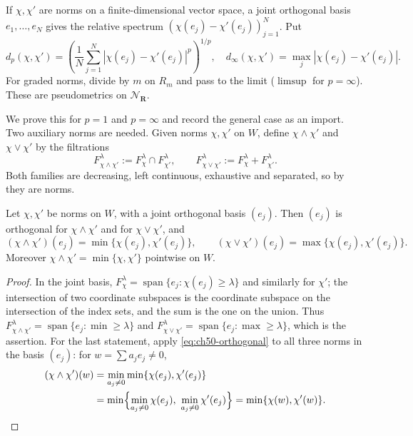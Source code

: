 If $\chi,\chi'$ are norms on a finite-dimensional vector space, a joint
orthogonal basis $e_1,\dots,e_N$ gives the relative spectrum
$(\chi(e_j)-\chi'(e_j))_{j=1}^N$.  Put
\[
 d_p(\chi,\chi')
 =\left(\frac1N\sum_{j=1}^N
       |\chi(e_j)-\chi'(e_j)|^p\right)^{1/p},
\quad
 d_\infty(\chi,\chi')=\max_j|\chi(e_j)-\chi'(e_j)|.
\tag{50.7}\label{eq:stability-finite-dimensional-dp}
\]
For graded norms, divide by $m$ on $R_m$ and pass to the limit
($\limsup$ for $p=\infty$).  These are pseudometrics on
$\mathcal N_{\mathbf R}$.

We prove this for $p=1$ and $p=\infty$ and record the general case as
an import.  Two auxiliary norms are needed.  Given norms $\chi,\chi'$ on
$W$, define $\chi\wedge\chi'$ and $\chi\vee\chi'$ by the filtrations
\[
 F^\lambda_{\chi\wedge\chi'}:=F^\lambda_\chi\cap F^\lambda_{\chi'},
 \qquad
 F^\lambda_{\chi\vee\chi'}:=F^\lambda_\chi+F^\lambda_{\chi'}.
\tag{50.8}\label{eq:ch50-lattice-norms}
\]
Both families are decreasing, left continuous, exhaustive and separated, so
by  they are norms.

\par\noindent\begin{minipage}{\textwidth}
\begin{lemma}
\label{lem:ch50-lattice}
Let $\chi,\chi'$ be norms on $W$, with a joint orthogonal basis
$(e_j)$.  Then $(e_j)$ is orthogonal for $\chi\wedge\chi'$ and for
$\chi\vee\chi'$, and
\[
 (\chi\wedge\chi')(e_j)=\min\{\chi(e_j),\chi'(e_j)\},
 \qquad
 (\chi\vee\chi')(e_j)=\max\{\chi(e_j),\chi'(e_j)\}.
\]
Moreover $\chi\wedge\chi'=\min\{\chi,\chi'\}$ pointwise on $W$.
\end{lemma}
\end{minipage}\par\medskip

\begin{proof}
In the joint basis, $F^\lambda_\chi=\operatorname{span}\{e_j:\chi(e_j)\ge
\lambda\}$ and similarly for $\chi'$; the intersection of two coordinate
subspaces is the coordinate subspace on the intersection of the index sets,
and the sum is the one on the union.  Thus
$F^\lambda_{\chi\wedge\chi'}=\operatorname{span}\{e_j:\min\ge\lambda\}$
and $F^\lambda_{\chi\vee\chi'}=\operatorname{span}\{e_j:\max\ge\lambda\}$,
which is the assertion.  For the last statement, apply
\eqref{eq:ch50-orthogonal} to all three norms in the basis $(e_j)$:
for $w=\sum a_je_j\ne0$,
\[
 \begin{split}
 (\chi\wedge\chi')(w)
 &=\min_{a_j\ne0}\min\{\chi(e_j),\chi'(e_j)\}\\
 &=\min\Bigl\{\min_{a_j\ne0}\chi(e_j),\ \min_{a_j\ne0}\chi'(e_j)\Bigr\}
 =\min\{\chi(w),\chi'(w)\}.
 \end{split}
\]
\end{proof}

